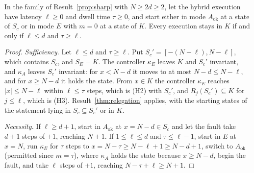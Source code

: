 \begin{newresult}\label{prop:region}
In the family of Result~\ref{prop:sharp} with $N\ge2d\ge2$, let the hybrid execution have latency $\ell\ge0$ and dwell time $\tau\ge0$, and start either in mode $A_{\mathrm{ok}}$ at a state of $S_c$ or in mode $E$ with $m=0$ at a state of $K$. Every execution stays in $K$ if and only if $\ell\le d$ and $\tau\ge\ell$.
\end{newresult}
\begin{proof}
\emph{Sufficiency.} Let $\ell\le d$ and $\tau\ge\ell$. Put $S_c'=[-(N-\ell),N-\ell]$, which contains $S_c$, and $S_E=K$. The controller $\kappa_E$ leaves $K$ and $S_c'$ invariant, and $\kappa_A$ leaves $S_c'$ invariant: for $x<N-d$ it moves to at most $N-d\le N-\ell$, and for $x\ge N-d$ it holds the state. From $x\in K$ the controller $\kappa_E$ reaches $|x|\le N-\ell$ within $\ell\le\tau$ steps, which is (H2) with $S_c'$, and $R_j(S_c')\subseteq K$ for $j\le\ell$, which is (H3). Result~\ref{thm:relegation} applies, with the starting states of the statement lying in $S_c\subseteq S_c'$ or in $K$.

\emph{Necessity.} If $\ell\ge d+1$, start in $A_{\mathrm{ok}}$ at $x=N-d\in S_c$ and let the fault take $d+1$ steps of $+1$, reaching $N+1$. If $1\le\ell\le d$ and $\tau\le\ell-1$, start in $E$ at $x=N$, run $\kappa_E$ for $\tau$ steps to $x=N-\tau\ge N-\ell+1\ge N-d+1$, switch to $A_{\mathrm{ok}}$ (permitted since $m=\tau$), where $\kappa_A$ holds the state because $x\ge N-d$, begin the fault, and take $\ell$ steps of $+1$, reaching $N-\tau+\ell\ge N+1$.
\end{proof}

